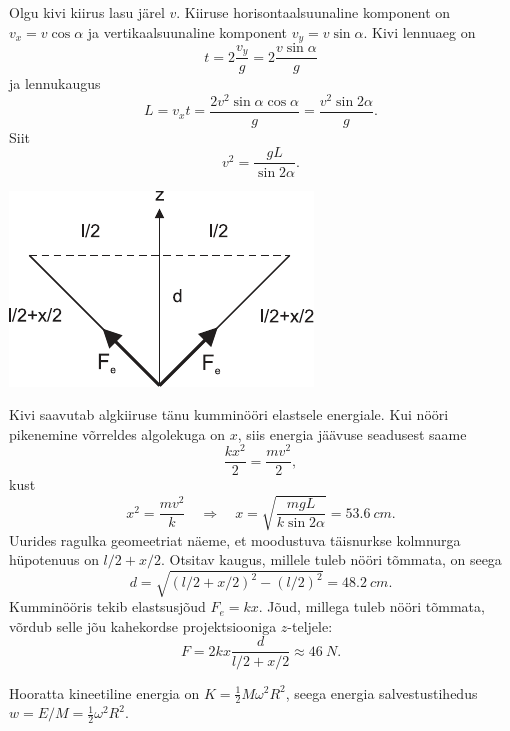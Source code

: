 \documentclass[10pt, twoside]{article}
\begin{document}
{
\solu
Olgu kivi kiirus lasu järel $v$. Kiiruse horisontaalsuunaline komponent on $v_x = v \cos \alpha$ ja vertikaalsuunaline komponent $v_y = v \sin \alpha$. Kivi lennuaeg on
\[
t = 2 \frac{v_y}{g} = 2 \frac{v\sin\alpha}{g}
\]
ja lennukaugus
\[
L=v_{x} t=\frac{2 v^{2} \sin \alpha \cos \alpha}{g}=\frac{v^{2} \sin 2 \alpha}{g}.
\]
Siit
\[
v^2 = \frac{gL}{\sin 2\alpha}.
\]

\begin{center}
	\includegraphics[width=0.5\linewidth]{2006-v3g-03-lah}
\end{center}

Kivi saavutab algkiiruse tänu kumminööri elastsele energiale. Kui nööri pikenemine võrreldes algolekuga on $x$, siis energia jäävuse seadusest saame
\[
\frac{k x^{2}}{2}=\frac{m v^{2}}{2},
\]
kust
\[
x^{2}=\frac{m v^{2}}{k} \quad\Rightarrow\quad x=\sqrt{\frac{m g L}{k \sin 2 \alpha}}=\SI{53,6}{cm}.
\]
Uurides ragulka geomeetriat näeme, et moodustuva täisnurkse kolmnurga hüpotenuus on $l/2+x/2$. Otsitav kaugus, millele tuleb nööri tõmmata, on seega
\[
d=\sqrt{(l / 2+x / 2)^{2}-(l / 2)^{2}}=\SI{48.2}{cm}.
\]
Kumminööris tekib elastsusjõud $F_e = kx$. Jõud, millega tuleb nööri tõmmata, võrdub selle jõu kahekordse projektsiooniga $z$-teljele:
\[
F=2 k x \frac{d}{l / 2+x/2} \approx \SI{46}{N}.
\]
\probend
\bigskip


\solu
\osa Hooratta kineetiline energia on $K = \frac{1}{2}M\omega^2R^2$, seega energia salvestustihedus $w = E/M = \frac{1}{2} \omega^2R^2$.

}
\end{document}
